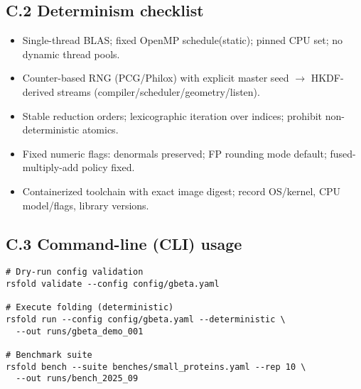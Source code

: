 \documentclass[12pt,a4paper]{article}
\begin{document}
\subsection*{C.2 Determinism checklist}
\begin{itemize}
  \item Single-thread BLAS; fixed OpenMP schedule(static); pinned CPU set; no dynamic thread pools.
  \item Counter-based RNG (PCG/Philox) with explicit master seed $\to$ HKDF-derived streams (compiler/scheduler/geometry/listen).
  \item Stable reduction orders; lexicographic iteration over indices; prohibit non-deterministic atomics.
  \item Fixed numeric flags: denormals preserved; FP rounding mode default; fused-multiply-add policy fixed.
  \item Containerized toolchain with exact image digest; record OS/kernel, CPU model/flags, library versions.
\end{itemize}

\subsection*{C.3 Command-line (CLI) usage}
\begin{verbatim}
# Dry-run config validation
rsfold validate --config config/gbeta.yaml

# Execute folding (deterministic)
rsfold run --config config/gbeta.yaml --deterministic \
  --out runs/gbeta_demo_001

# Benchmark suite
rsfold bench --suite benches/small_proteins.yaml --rep 10 \
  --out runs/bench_2025_09
\end{verbatim}
\end{document}
